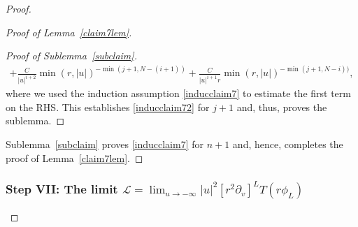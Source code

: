 \documentclass[11pt,english]{article}
\numberwithin{equation}{section}
\theoremstyle{remark}
\theoremstyle{plain}
\newtheorem{claim}{Claim}
\theoremstyle{remark}
\newcommand{\pv}{\partial_v}
\renewcommand{\(}{\left(}
\renewcommand{\)}{\right)}
\begin{document}
\begin{proof}
\begin{proof}[Proof of Lemma~\ref{claim7lem}]
\begin{proof}[Proof of Sublemma~\ref{subclaim}]
\begin{multline}
+\frac{C}{|u|^{i+2}}\min(r,|u|)^{-\min(j+1, N-(i+1))}+\frac{C}{|u|^{i+1}r}\min(r,|u|)^{-\min(j+1, N-i))},
\end{multline}
where we used the induction assumption \eqref{inducclaim7} to estimate the first term on the RHS. This establishes \eqref{inducclaim72} for $j+1$ and, thus, proves the sublemma.
\end{proof}
Sublemma~\ref{subclaim}  proves \eqref{inducclaim7} for $n+1$ and, hence, completes the proof of Lemma~\ref{claim7lem}.
\end{proof}
\subsubsection*{Step VII: The limit $\mathcal{L}=\lim_{u\to-\infty}|u|^2[r^2\pv]^LT(r\phi_L)$}


\end{proof}
\end{document}
